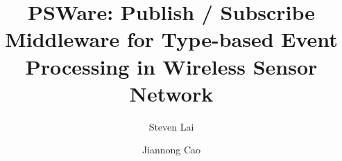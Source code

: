 \title{PSWare: Publish / Subscribe Middleware for Type-based Event Processing in Wireless Sensor Network}
\author{Steven Lai \and Jiannong Cao}
\maketitle